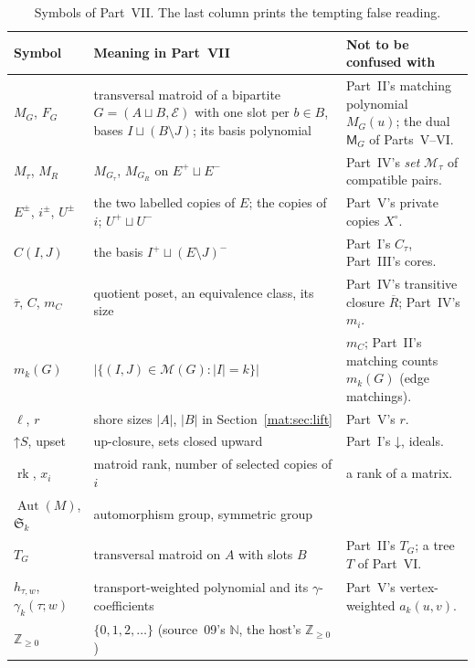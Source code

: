 \documentclass[11pt]{article}
\numberwithin{equation}{section}
\theoremstyle{definition}
\newcommand{\N}{\mathbb Z_{\geq0}}
\newcommand{\down}{\mathord\downarrow}
\newcommand{\PM}{\mathcal M}
\newcommand{\Aut}{\operatorname{Aut}}
\newcommand{\rk}{\operatorname{rk}}
\begin{document}
\begin{table}[tbp]
\centering\footnotesize
\caption{Symbols of Part~VII. The last column prints the tempting false
reading.}
\label{mat:tab:notation}
\begin{tabularx}{\textwidth}{@{}>{\raggedright}p{}>{\raggedright}p{}Y@{}}
\toprule
Symbol & Meaning in Part~VII & Not to be confused with\\
\midrule
$M_G$, $F_G$ & transversal matroid of a bipartite $G=(A\sqcup B,\mathcal E)$
 with one slot per $b\in B$, bases $I\sqcup(B\setminus J)$; its basis
 polynomial & Part~II's matching polynomial $M_G(u)$; the dual $\mathsf M_G$
 of Parts~V--VI.\\
$M_\tau$, $M_R$ & $M_{G_\tau}$, $M_{G_R}$ on $E^+\sqcup E^-$ & Part~IV's
 \emph{set} $\mathscr M_\tau$ of compatible pairs.\\
$E^\pm$, $i^\pm$, $U^\pm$ & the two labelled copies of $E$; the copies of
 $i$; $U^+\sqcup U^-$ & Part~V's private copies $X^\circ$.\\
$C(I,J)$ & the basis $I^+\sqcup(E\setminus J)^-$ & Part~I's $C_\tau$, Part~III's
 cores.\\
$\overline\tau$, $C$, $m_C$ & quotient poset, an equivalence class, its size &
 Part~IV's transitive closure $\overline R$; Part~IV's $m_i$.\\
$m_k(G)$ & $|\{(I,J)\in\PM(G):|I|=k\}|$ & $m_C$; Part~II's matching counts
 $m_k(G)$ (edge matchings).\\
$\ell$, $r$ & shore sizes $|A|$, $|B|$ in Section~\ref{mat:sec:lift} &
 Part~V's $r$.\\
$\mathord\uparrow S$, upset & up-closure, sets closed upward & Part~I's
 $\down$, ideals.\\
$\rk$, $x_i$ & matroid rank, number of selected copies of $i$ & a rank of a
 matrix.\\
$\Aut(M)$, $\mathfrak S_k$ & automorphism group, symmetric group & \\
$T_G$ & transversal matroid on $A$ with slots $B$ & Part~II's $T_G$; a tree
 $T$ of Part~VI.\\
$h_{\tau,w}$, $\gamma_k(\tau;w)$ & transport-weighted polynomial and its
 $\gamma$-coefficients & Part~V's vertex-weighted $a_k(u,v)$.\\
$\N$ & $\{0,1,2,\ldots\}$ (source~09's $\mathbb N$, the host's $\N$) & \\
\bottomrule
\end{tabularx}
\end{table}
\end{document}
